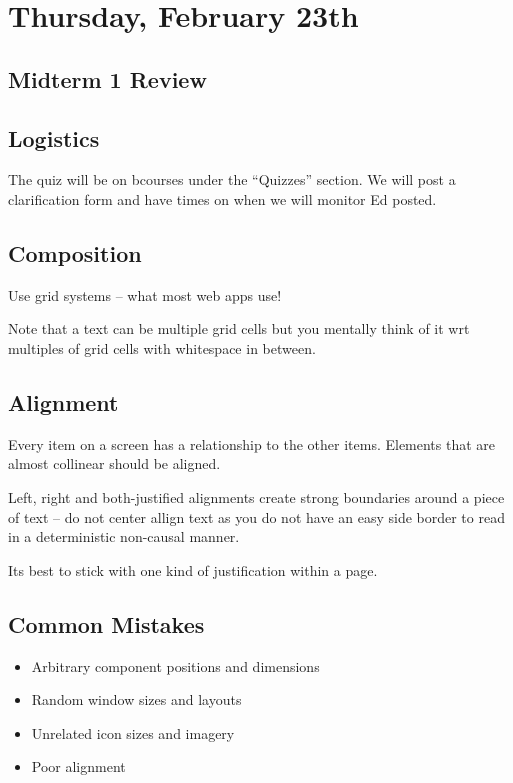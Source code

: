 \section{Thursday, February 23th}
\subsection{Midterm 1 Review}
\subsection{Logistics}
The quiz will be on bcourses under the ``Quizzes'' section. We will post a clarification form and have times on when we will monitor Ed posted.

\subsection{Composition}
Use grid systems -- what most web apps use!

Note that a text can be multiple grid cells but you mentally think of it wrt multiples of grid cells with whitespace in between.

\subsection{Alignment}
Every item on a screen has a relationship to the 
other items. Elements that are almost collinear 
should be aligned. 

Left, right and both-justified alignments create strong 
boundaries around a piece of text -- do not center allign text as you do not have an easy side border to read in a deterministic non-causal manner. 

Its best to stick with one kind of justification within 
a page.

\subsection{Common Mistakes}
\begin{important}
\begin{itemize}
    \item Arbitrary component positions and dimensions
    \item Random window sizes and layouts
    \item Unrelated icon sizes and imagery
    \item Poor alignment
\end{itemize}
\end{important}


